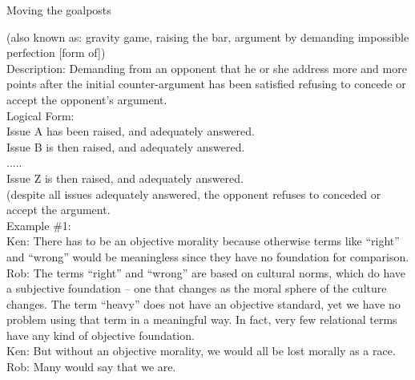 \documentclass[a4paper,12pt,single,pdftex]{scrartcl}
\begin{document}
  

Moving the goalposts
    
      (also known as: gravity game, raising the bar, argument by demanding impossible perfection [form of])
    \\

  
    
      Description: Demanding from an opponent that he or she address more and more points after the initial counter-argument has been satisfied refusing to concede or accept the opponent’s argument.
    \\

    
      Logical Form:
    \\

    
      Issue A has been raised, and adequately answered.
    \\

    
      Issue B is then raised, and adequately answered.
    \\

    
      .....
    \\

    
      Issue Z is then raised, and adequately answered.
    \\

    
      (despite all issues adequately answered, the opponent refuses to conceded or accept the argument.
    \\

    
      Example \#1:
    \\

    
      Ken: There has to be an objective morality because otherwise terms like “right” and “wrong” would be meaningless since they have no foundation for comparison. 
    \\

    
      Rob: The terms “right” and “wrong” are based on cultural norms, which do have a subjective foundation -- one that changes as the moral sphere of the culture changes.  The term “heavy” does not have an objective standard, yet we have no problem using that term in a meaningful way.  In fact, very few relational terms have any kind of objective foundation.
    \\

    
      Ken: But without an objective morality, we would all be lost morally as a race.
    \\

    
      Rob: Many would say that we are.
    \\
\end{document}
